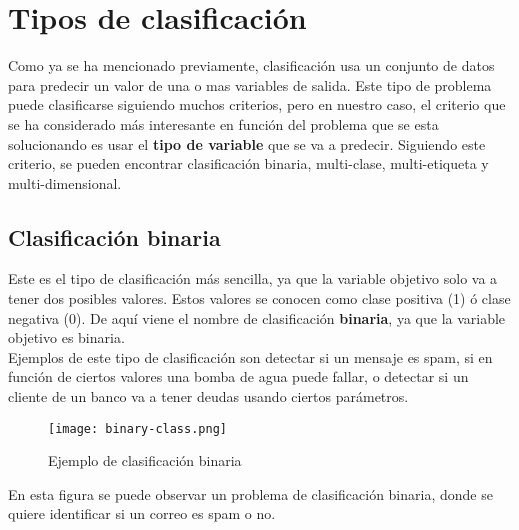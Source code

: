 \section{Tipos de clasificación}
Como ya se ha mencionado previamente, clasificación usa un conjunto de datos para predecir un valor de una o mas variables de salida. Este tipo de problema puede clasificarse siguiendo muchos criterios, pero en nuestro caso, el criterio que se ha considerado más interesante en función del problema que se esta solucionando es usar el \textbf{tipo de variable} que se va a predecir. Siguiendo este criterio, se pueden encontrar clasificación binaria, multi-clase, multi-etiqueta y multi-dimensional.
\subsection*{Clasificación binaria}
Este es el tipo de clasificación más sencilla, ya que la variable objetivo solo va a tener dos posibles valores. Estos valores se conocen como clase positiva (1) ó clase negativa (0). De aquí viene el nombre de clasificación \textbf{binaria}, ya que la variable objetivo es binaria.\\
Ejemplos de este tipo de clasificación son detectar si un mensaje es spam, si en función de ciertos valores una bomba de agua puede fallar, o detectar si un cliente de un banco va a tener deudas usando ciertos parámetros.
\begin{figure}[H]
	\centering
	\texttt{[image: binary-class.png]}
	\caption{Ejemplo de clasificación binaria}
	\label{fig:bclass}
\end{figure}
En esta figura se puede observar un problema de clasificación binaria, donde se quiere identificar si un correo es spam o no. 
